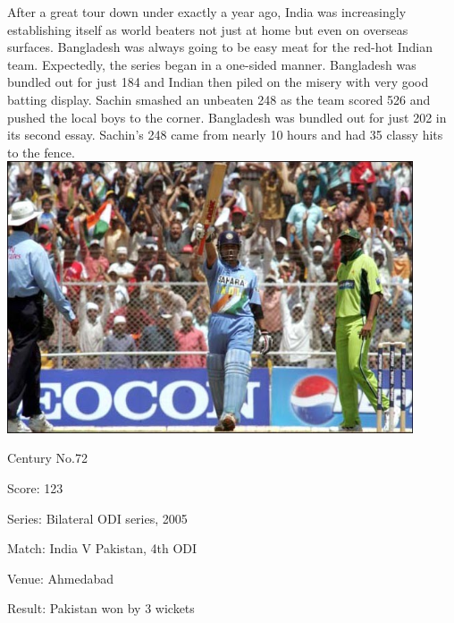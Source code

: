 \documentclass[11pt, a4paper]{article}
\begin{document}
After a great tour down under exactly a year ago, India was increasingly establishing itself as world beaters not just at home but even on overseas surfaces. Bangladesh was always going to be easy meat for the red-hot Indian team. Expectedly, the series began in a one-sided manner. Bangladesh was bundled out for just 184 and Indian then piled on the misery with very good batting display. Sachin smashed an unbeaten 248 as the team scored 526 and pushed the local boys to the corner. Bangladesh was bundled out for just 202 in its second essay. Sachin's 248 came from nearly 10 hours and had 35 classy hits to the fence.
\newpage
\includegraphics[width=0.9\textwidth]{pics/72.jpg}

Century No.72 

Score: 123 

Series: Bilateral ODI series, 2005 

Match: India V Pakistan, 4th ODI 

Venue: Ahmedabad 

Result: Pakistan won by 3 wickets 
\end{document}
